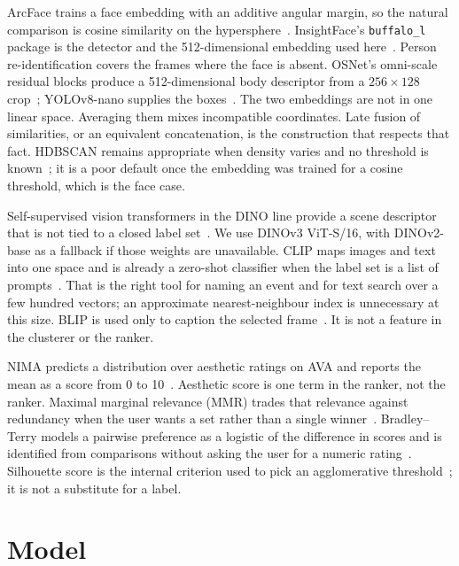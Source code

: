 \documentclass[conference]{IEEEtran}
\begin{document}
ArcFace trains a face embedding with an additive angular margin, so the natural
comparison is cosine similarity on the hypersphere~\cite{deng2019arcface}.
InsightFace's \texttt{buffalo\_l} package is the detector and the 512-dimensional
embedding used here~\cite{insightface}. Person re-identification covers the
frames where the face is absent. OSNet's omni-scale residual blocks produce a
512-dimensional body descriptor from a $256\times128$ crop~\cite{zhou2019osnet};
YOLOv8-nano supplies the boxes~\cite{jocher2023yolov8}. The two embeddings are
not in one linear space. Averaging them mixes incompatible coordinates. Late
fusion of similarities, or an equivalent concatenation, is the construction
that respects that fact. HDBSCAN remains appropriate when density varies and
no threshold is known~\cite{mcinnes2017hdbscan}; it is a poor default once the
embedding was trained for a cosine threshold, which is the face case.

Self-supervised vision transformers in the DINO line provide a scene descriptor
that is not tied to a closed label set~\cite{oquab2024dinov2,simeoni2025dinov3}.
We use \mbox{DINOv3} ViT-S/16, with DINOv2-base as a fallback if those weights are
unavailable. CLIP maps images and text into one space and is already a
zero-shot classifier when the label set is a list of
prompts~\cite{radford2021clip}. That is the right tool for naming an event and
for text search over a few hundred vectors; an approximate nearest-neighbour
index is unnecessary at this size. BLIP is used only to caption the selected
frame~\cite{li2022blip}. It is not a feature in the clusterer or the ranker.

NIMA predicts a distribution over aesthetic ratings on AVA and reports the
mean as a score from 0 to 10~\cite{talebi2018nima,murray2012ava}. Aesthetic
score is one term in the ranker, not the ranker. Maximal marginal relevance
(MMR) trades that relevance against redundancy when the user wants a set
rather than a single winner~\cite{carbonell1998mmr}. Bradley--Terry models a
pairwise preference as a logistic of the difference in scores and is identified
from comparisons without asking the user for a numeric
rating~\cite{bradley1952rank}. Silhouette score is the internal criterion used
to pick an agglomerative threshold~\cite{rousseeuw1987silhouettes}; it is not a
substitute for a label.

\section{Model}
\label{sec:model}
\end{document}
